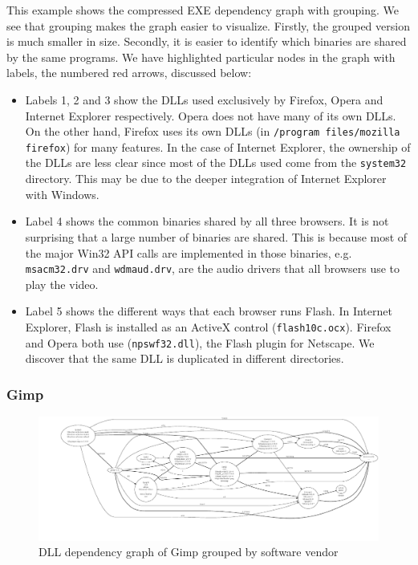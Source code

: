 This example shows the compressed EXE dependency gra\-ph
with grouping.
We see that grouping makes the graph easier to visualize.
Firstly, the grouped version is much smaller in size.
Secondly, it is easier to identify which binaries are shared by the same programs.
We have highlighted particular nodes in the graph with
labels, the numbered red arrows, discussed below:
\begin{itemize}


\item Labels 1, 2 and 3 show the DLLs used exclusively by Firefox, Opera
and Internet Explorer respectively. Opera does not have many  of its own DLLs.
On the other hand, Firefox uses its own DLLs (in {\tt /program files/mozilla firefox}) for many features.
In the case of Internet Explorer, the ownership of the DLLs are less clear
since most of the DLLs used come from the {\tt system32} directory.
This may be due to the deeper integration of Internet Explorer with
Windows.

\item Label 4 shows the common binaries shared by all three browsers.
It is not surprising that a large number of binaries are shared.
This is because most of the major Win32 API calls
are implemented in those binaries, e.g.
\texttt{msacm32.drv} and \texttt{wdmaud.drv},
are the audio drivers that all browsers use to play the video.


\item Label 5 shows the different ways that each browser runs Flash.
In Internet Explorer,
Flash is installed as an ActiveX control (\texttt{flash10c.ocx}).
Firefox and Opera both use (\texttt{npswf32.dll}), the Flash plugin
for Netscape. We discover that the same DLL is duplicated in
different directories.

\end{itemize}

\subsubsection{Gimp}

\begin{figure}
\includegraphics[width=1.0\textwidth]{depvis/gimp-vendor.pdf}
\caption{DLL dependency graph of Gimp grouped by software vendor}
\label{fig:gimp-vendor}
\end{figure}

